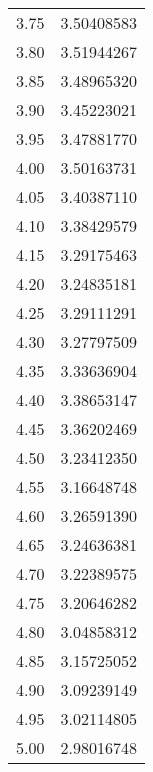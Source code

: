 \documentclass[
    number={9},
    title={Epidemics}
]{math486homework}
\begin{document}
\begin{table}[H]
\begin{tabular}{c r}
        3.75 & 3.50408583\\
        3.80 & 3.51944267\\
        3.85 & 3.48965320\\
        3.90 & 3.45223021\\
        3.95 & 3.47881770\\
        4.00 & 3.50163731\\
        4.05 & 3.40387110\\
        4.10 & 3.38429579\\
        4.15 & 3.29175463\\
        4.20 & 3.24835181\\
        4.25 & 3.29111291\\
        4.30 & 3.27797509\\
        4.35 & 3.33636904\\
        4.40 & 3.38653147\\
        4.45 & 3.36202469\\
        4.50 & 3.23412350\\
        4.55 & 3.16648748\\
        4.60 & 3.26591390\\
        4.65 & 3.24636381\\
        4.70 & 3.22389575\\
        4.75 & 3.20646282\\
        4.80 & 3.04858312\\
        4.85 & 3.15725052\\
        4.90 & 3.09239149\\
        4.95 & 3.02114805\\
        5.00 & 2.98016748\\
	\end{tabular}
\end{table}
\end{document}
